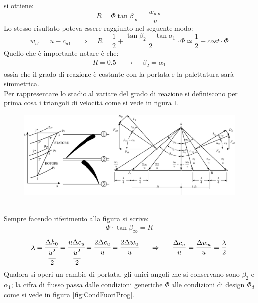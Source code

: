 si ottiene:
\begin{equation}
\boxed{R = \Phi \tan \beta_{\infty} = \frac{w_{u \infty}}{u}}
\end{equation}
Lo stesso risultato poteva essere raggiunto nel seguente modo:
\begin{equation}
w_{u1} = u - c_{u1} \;\;\;\; \Rightarrow \;\;\;\; R = \frac{1}{2} + \frac{\tan \beta_2 - \tan \alpha_1}{2} \cdot \Phi \simeq \frac{1}{2} + cost \cdot \Phi
\end{equation}
Quello che è importante notare è che:
\begin{align*}
R = 0.5 \;\;\;\; \to \;\;\;\; \beta_2 = \alpha_1
\end{align*}
ossia che il grado di reazione è costante con la portata e la palettatura sarà simmetrica.\\
Per rappresentare lo stadio al variare del grado di reazione si definiscono per prima cosa i triangoli di velocità come si vede in figura \ref{fig:StadioRipetuto}.
\begin{figure}
\centering
  \includegraphics[width=\textwidth]{fig/StadioRipetuto.pdf}
\caption{}
\label{fig:StadioRipetuto}
\end{figure}
\\Sempre facendo riferimento alla figura si scrive:
\begin{align*}
\Phi \cdot \tan \beta_{\infty} = R
\end{align*}
\begin{align*}
\lambda = \cfrac{\Delta h_0}{\cfrac{u^2}{2}} = \cfrac{u \Delta c_u}{\cfrac{u^2}{2}} = \cfrac{2 \Delta c_u}{u} = \cfrac{2 \Delta w_u}{u} \;\;\;\;\;\; \Rightarrow \;\;\;\;\;\; \frac{\Delta c_u}{u} = \frac{\Delta w_u}{u} = \frac{\lambda}{2}
\end{align*}
Qualora si operi un cambio di portata, gli unici angoli che si conservano sono $\beta_2$ e $\alpha_1$; la cifra di flusso passa dalle condizioni generiche $\Phi$ alle condizioni di design $\Phi_d$ come si vede in figura \ref{fig:CondFuoriProg}.
